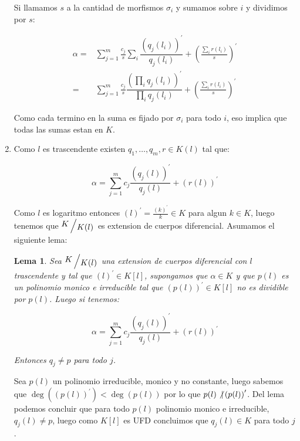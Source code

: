 \documentclass[11pt]{article}
\newcommand{\quotient}[2]{{\raisebox{.2em}{$#1$}\left/\raisebox{-.2em}{$#2$}\right.}}
\newcommand{\derivation}[1]{\left(#1\right)^\prime}
\numberwithin{theorem}{subsection}
\newtheorem{lemma}[theorem]{Lema}
\newenvironment{proof}[1][Demostraci\'on]{\begin{trivlist}
		\item[\hskip \labelsep {\bfseries #1}]}{\end{trivlist}}
\begin{document}
\begin{proof}
\begin{enumerate}
		Si llamamos $s$ a la cantidad de morfismos $\sigma_i$ y sumamos sobre $i$ y dividimos por $s$:
		
		\begin{equation}
		\begin{aligned}
		\alpha = & \sum\limits_{j=1}^{m} \frac{c_j}{s} \sum\limits_i{\dfrac{\derivation{q_j(l_i)}}{q_j(l_i)}} + \derivation{\frac{\sum\limits_i{r(l_i)}}{s}} \\
		=& \sum\limits_{j=1}^{m} \frac{c_j}{s} {\dfrac{\derivation{\prod\limits_i q_j(l_i)}}{\prod\limits_i q_j(l_i)}} + \derivation{\frac{\sum\limits_i{r(l_i)}}{s}}
		\end{aligned}
		\end{equation}
		
		Como cada termino en la suma es fijado por $\sigma_i$ para todo $i$, eso implica que todas las sumas estan en $K$.
		
		\item[$l$ es un logaritmo]
		
		Como $l$ es trascendente existen $q_1, \dots, q_m, r \in K(l)$ tal que:
		
		\begin{equation}
			\alpha = \sum\limits_{j=1}^{m} c_j \dfrac{\derivation{q_j(l)}}{q_j(l)} + \derivation{r(l)}
		\end{equation}
		
		Como $l$ es logaritmo entonces $\derivation{l} = \frac{\derivation{k}}{k} \in K$ para algun $k \in K$, luego tenemos que $\quotient{K}{K(l)}$ es extension de cuerpos diferencial. Asumamos el siguiente lema:
		
		\begin{lemma}
			Sea $\quotient{K}{K(l)}$ una extension de cuerpos diferencial con $l$ trascendente y tal que $\derivation{l} \in K[l]$, supongamos que $\alpha \in K$ y que $p(l)$ es un polinomio monico e irreducible tal que $\derivation{p(l)} \in K[l]$ no es dividible por $p(l)$. Luego si tenemos:
			
			\begin{equation}
			\alpha = \sum\limits_{j=1}^{m} c_j \dfrac{\derivation{q_j(l)}}{q_j(l)} + \derivation{r(l)}
			\end{equation}
			
			Entonces $q_j \neq p$ para todo $j$.
		\end{lemma}
		
		Sea $p(l)$ un polinomio irreducible, monico y no constante, luego sabemos que $\deg(\derivation{p(l)}) < \deg(p(l))$ por lo que $p(l) \not\vert \derivation{p(l)}$. Del lema podemos concluir que para todo $p(l)$ polinomio monico e irreducible, $q_j(l) \neq p$, luego como $K[l]$ es UFD concluimos que $q_j(l) \in K$ para todo $j$.
		

\end{enumerate}
\end{proof}
\end{document}
